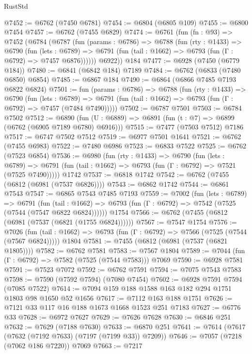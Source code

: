 \begin{lexlean}{RustStd}
\begin{coremodule}
@7452 := @6762 (@7450 @6781)
@7454 := @6804 (@6805 @109)
@7455 := @6800 @7454
@7457 := @6762 (@7455 @6829)
@7474 := @6761
    (fun (fn : @93) =>
    @7452
      (@6784
        (@6787
          (fun (params : @6786) =>
          @6788
            (fun (rty : @1433) =>
            @6790
              (fun (lets : @6789) =>
              @6791 (fun (tail : @1662) => @6793 (fun (Γ : @6792) => @7457 @6876))))))
        @6922))
    @184
@7477 := @6928 (@7450 (@6779 @184))
@7480 := @6841 (@6842 @184) @7189
@7484 := @6762 (@6833 (@7480 @6850) @6854)
@7485 := @6867 @184
@7490 := @6864 (@6866 @7485 @7193 @6822 @6824)
@7501 := fun (params : @6786) =>
  @6788
    (fun (rty : @1433) =>
    @6790
      (fun (lets : @6789) =>
      @6791 (fun (tail : @1662) => @6793 (fun (Γ : @6792) => @7457 (@7484 @7490)))))
@7502 := @6787 @7501
@7503 := @6784 @7502
@7512 := @6890 (fun (U : @6889) => @6891 (fun (t : @7) => @6899 (@6762 (@6905 @7189 @6780) @6916)))
@7515 := @7477 (@7503 @7512) @7186
@7517 := @6747 @7502 @7512
@7519 := @6977 @7501 @1641
@7521 := @6762 (@7455 @6983)
@7522 := @7480 @6986
@7523 := @6833 @7522
@7525 := @6762 (@7523 @6854)
@7536 := @6980
    (fun (rty : @1433) =>
    @6790
      (fun (lets : @6789) =>
      @6791 (fun (tail : @1662) => @6793 (fun (Γ : @6792) => @7521 (@7525 @7490)))))
    @1742
@7537 := @6818 @1742
@7542 := @6762 (@7455 (@6812 (@6981 (@7537 @6826))))
@7543 := @6862 @1742
@7544 := @6861 @7543
@7547 := @6865 @7543 @7485 @7193
@7559 := @7002
    (fun (lets : @6789) =>
    @6791
      (fun (tail : @1662) => @6793 (fun (Γ : @6792) => @7542 (@7525 (@7544 (@7547 @6822 @6824))))))
    @1754
@7566 := @6762 (@7455 (@6812 (@6981 (@7537 (@6821 (@1755 @6824))))))
@7567 := @7547 @1754
@7576 := @7026
    (fun (tail : @1662) => @6793 (fun (Γ : @6792) => @7566 (@7525 (@7544 (@7567 @6824)))))
    @1804
@7581 := @7455 (@6812 (@6981 (@7537 (@6821 @1805))))
@7582 := @6762 @7581
@7583 := @7567 @1804
@7589 := @7044 (fun (Γ : @6792) => @7582 (@7525 (@7544 @7583))) @7069
@7590 := @6928 @7581
@7591 := @7523 @7072
@7592 := @6762 @7591
@7594 := @7075 @7543 @7583
@7598 := @7590 (@7592 @7594) (@7080 @7454)
@7602 := @6928 @7591 @7594 (@7085 @7522)
@7614 := @7094 @159 @188 @1588 @163 @182 @294 @1751 @1803 @98 @1650 @52 @1656
@7617 := @7112 @163 @188 @1751
@7626 := @7121 @33 @117 @16 @188 @1673 @1668 @1523 @251 @7183
@7627 := @6776 @33
@7628 := @6972 @7627
@7629 := @7626 @7628
@7630 := @6846 @251
@7632 := @7629 (@7188 @7630)
@7633 := @6870 @251
@7641 := @7614 (@7617 (@7632 (@7192 @7633) (@7197 (@7199 @33)) @7209))
@7646 := @7057 (@7218 (@7062 @186 @7220)) @7069
@7663 := @7217

\end{coremodule}
\end{lexlean}
